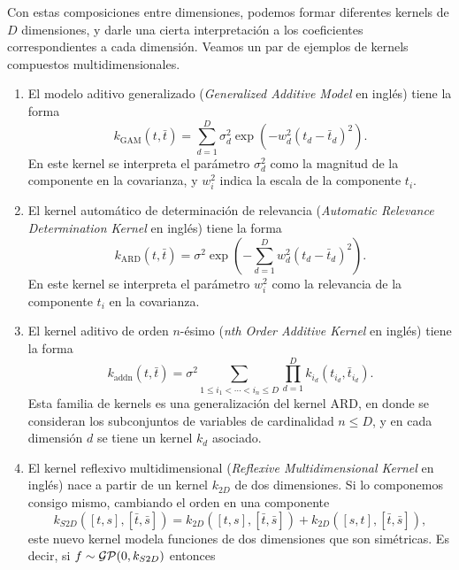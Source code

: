 Con estas composiciones entre dimensiones, podemos formar diferentes kernels de \(D\) dimensiones, y darle una cierta interpretación a los coeficientes correspondientes a cada dimensión. Veamos un par de ejemplos de kernels
compuestos multidimensionales.
\begin{enumerate}
	\item El modelo aditivo generalizado (\emph{Generalized Additive Model} en inglés) tiene la forma
	\begin{equation*}
		k_{\mathrm{GAM}}(t, \bar{t}) = \sum_{d=1}^{D} \sigma_{d}^{2} \exp\left(-w_{d}^{2} (t_{d} - \bar{t}_{d})^{2}\right).
	\end{equation*}
	En este kernel se interpreta el parámetro \(\sigma_{d}^{2}\) como la magnitud de la componente en la covarianza, y \(w_{i}^{2}\) indica la escala de la componente \(t_{i}\).
	\item El kernel automático de determinación de relevancia (\emph{Automatic Relevance Determination Kernel} en inglés) tiene la forma
	\begin{equation*}
		k_{\mathrm{ARD}}(t, \bar{t}) = \sigma^2 \exp \left(-\sum_{d=1}^{D} w_{d}^{2} (t_{d} - \bar{t}_{d})^{2}\right).
	\end{equation*}
	En este kernel se interpreta el parámetro \(w_{i}^{2}\) como la relevancia de la componente \(t_{i}\) en la covarianza.
	\item El kernel aditivo de orden \(n\)-ésimo (\emph{nth Order Additive Kernel} en inglés) tiene la forma
	\begin{equation*}
		k_{\mathrm{addn}}(t, \bar{t}) = \sigma^2 \sum_{1\leq i_{1} < \dotsb <i_{n} \leq D} \prod_{d=1}^{D} k_{i_{d}}\left(t_{i_{d}}, \bar{t}_{i_{d}}\right).
	\end{equation*}
	Esta familia de kernels \cite{30} es una generalización del kernel ARD, en donde se consideran los subconjuntos de variables de cardinalidad \(n \leq D\), y en cada dimensión \(d\) se tiene un kernel \(k_{d}\) asociado.
	\item El kernel reflexivo multidimensional (\emph{Reflexive Multidimensional Kernel} en inglés) nace a partir de un kernel \(k_{2D}\) de dos dimensiones. Si lo componemos consigo mismo, cambiando el orden en una componente
	\begin{equation*}
		k_{S2D}([t, s], [\bar{t}, \bar{s}]) = k_{2D}([t, s], [\bar{t}, \bar{s}]) + k_{2D}([s, t], [\bar{t}, \bar{s}]),
	\end{equation*}
	este nuevo kernel modela funciones de dos dimensiones que son simétricas. Es decir, si \(f \sim \operatorname{\mathcal{GP}}(0, k_{S2D})\) entonces

\end{enumerate}
